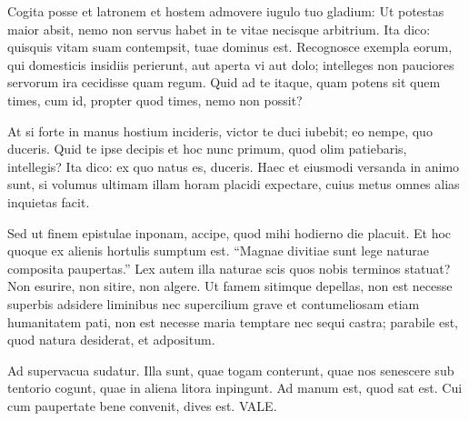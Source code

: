 {Cogita posse et latronem et hostem admovere iugulo tuo gladium: Ut potestas maior absit, nemo non servus habet in te vitae necisque arbitrium. Ita dico: quisquis vitam suam contempsit, tuae dominus est. Recognosce exempla eorum, qui domesticis insidiis perierunt, aut aperta vi aut dolo; intelleges non pauciores servorum ira cecidisse quam regum. Quid ad te itaque, quam potens sit quem times, cum id, propter quod times, nemo non possit?

At si forte in manus hostium incideris, victor te duci iubebit; eo nempe, quo duceris. Quid te ipse decipis et hoc nunc primum, quod olim patiebaris, intellegis? Ita dico: ex quo natus es, duceris. Haec et eiusmodi versanda in animo sunt, si volumus ultimam illam horam placidi expectare, cuius metus omnes alias inquietas facit. 

Sed ut finem epistulae inponam, accipe, quod mihi hodierno die placuit. Et hoc quoque ex alienis hortulis sumptum est. ``Magnae divitiae sunt lege naturae composita paupertas.'' Lex autem illa naturae scis quos nobis terminos statuat? Non esurire, non sitire, non algere. Ut famem sitimque depellas, non est necesse superbis adsidere liminibus nec supercilium grave et contumeliosam etiam humanitatem pati, non est necesse maria temptare nec sequi castra; parabile est, quod natura desiderat, et adpositum.

Ad supervacua sudatur. Illa sunt, quae togam conterunt, quae nos senescere sub tentorio cogunt, quae in aliena litora inpingunt. Ad manum est, quod sat est. Cui cum paupertate bene convenit, dives est. VALE.


}




